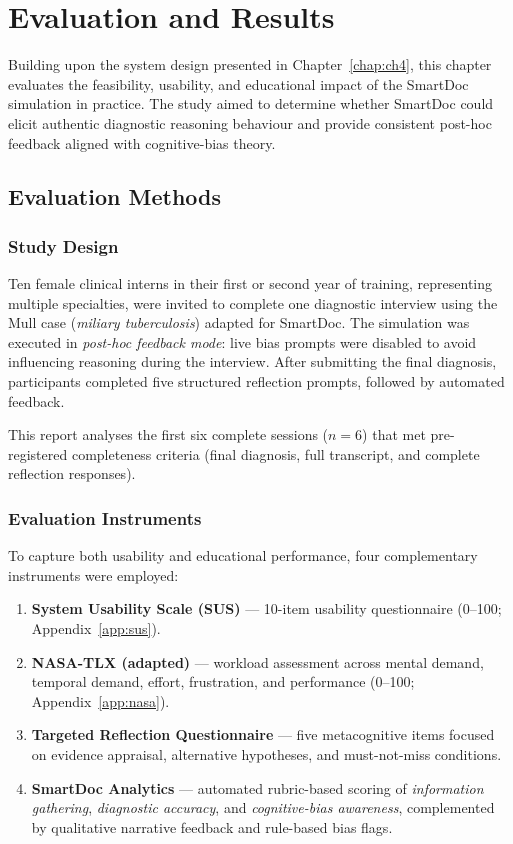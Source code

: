 \chapter{Evaluation and Results}
\label{chap:results}

Building upon the system design presented in Chapter~\ref{chap:ch4}, this chapter evaluates
the feasibility, usability, and educational impact of the SmartDoc simulation in practice.
The study aimed to determine whether SmartDoc could elicit authentic diagnostic reasoning
behaviour and provide consistent post-hoc feedback aligned with cognitive-bias theory.

\section{Evaluation Methods}

\subsection{Study Design}

Ten female clinical interns in their first or second year of training, representing multiple
specialties, were invited to complete one diagnostic interview using the Mull case
(\textit{miliary tuberculosis}) adapted for SmartDoc.  
The simulation was executed in \textit{post-hoc feedback mode}: live bias prompts were
disabled to avoid influencing reasoning during the interview.  
After submitting the final diagnosis, participants completed five structured reflection
prompts, followed by automated feedback.

This report analyses the first six complete sessions (\(n=6\)) that met
pre-registered completeness criteria (final diagnosis, full transcript, and complete
reflection responses).

\subsection{Evaluation Instruments}

To capture both usability and educational performance, four complementary instruments were
employed:

\begin{enumerate}
  \item \textbf{System Usability Scale (SUS)} — 10-item usability questionnaire
  (0–100; Appendix~\ref{app:sus}).
  \item \textbf{NASA-TLX (adapted)} — workload assessment across mental demand,
  temporal demand, effort, frustration, and performance (0–100; Appendix~\ref{app:nasa}).
  \item \textbf{Targeted Reflection Questionnaire} — five metacognitive items focused on
  evidence appraisal, alternative hypotheses, and must-not-miss conditions.
  \item \textbf{SmartDoc Analytics} — automated rubric-based scoring of
  \textit{information gathering}, \textit{diagnostic accuracy}, and
  \textit{cognitive-bias awareness}, complemented by qualitative narrative feedback and
  rule-based bias flags.
\end{enumerate}

